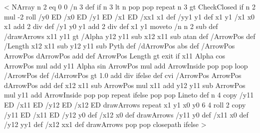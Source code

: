 <{%
    NArray n 2 eq { 0 0 /n 3 def } if
    n 3 lt {
	n { pop pop } repeat
    }{
	n 3 gt { CheckClosed } if
	n 2 mul
	-2 roll
	/y0 ED
	/x0 ED
    	/y1 ED
    	/x1 ED
    	/xx1 x1 def
    	/yy1 y1 def
    	x1 y1
    	/x1 x0 x1 add 2 div def
    	/y1 y0 y1 add 2 div def
    	x1 y1 moveto
    	/n n 2 sub def
	/drawArrows {
	    x11 y11
	    \psk@ArrowInsidePos{} gt {
		/Alpha y12 y11 sub x12 x11 sub atan def
		/ArrowPos \psk@ArrowInsideOffset\space def
		/Length x12 x11 sub y12 y11 sub Pyth def
		/dArrowPos \psk@ArrowInsidePos\space abs def
		{
		    /ArrowPos ArrowPos dArrowPos add def
		    ArrowPos Length gt { exit } if
		    x11 Alpha cos ArrowPos mul add
		    y11 Alpha sin ArrowPos mul add
		    ArrowInside
		    pop pop
		} loop
	    }{
		/ArrowPos \psk@ArrowInsideOffset\space def
		/dArrowPos  gt {%
	    	    1.0  add div
		}{ \psk@ArrowInsidePos } ifelse def
		\psk@ArrowInsideNo cvi {
		    /ArrowPos ArrowPos dArrowPos add def
		    x12 x11 sub ArrowPos mul x11 add
		    y12 y11 sub ArrowPos mul y11 add
        	    ArrowInside
		    pop pop
		} repeat
	    } ifelse
	    pop pop Lineto
	} def
	n {
	    4 copy
	    /y11 ED /x11 ED /y12 ED /x12 ED
	    drawArrows
	} repeat
	x1 y1 x0 y0
	6 4 roll
	2 copy
	/y11 ED /x11 ED /y12 y0 def /x12 x0 def
	drawArrows
	/y11 y0 def /x11 x0 def /y12 yy1 def /x12 xx1 def
	drawArrows
	pop pop
    	closepath
    } ifelse %
}>
%
%
